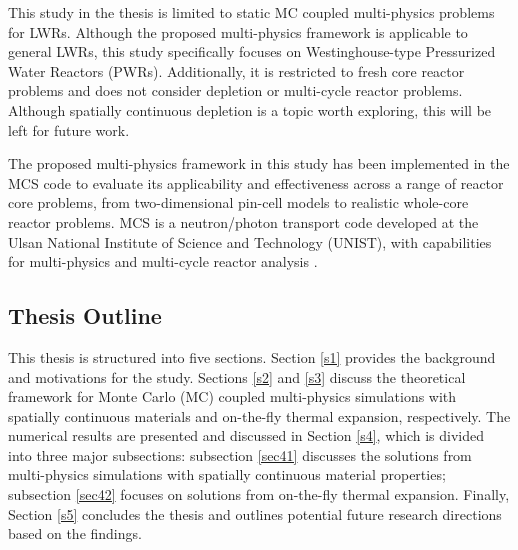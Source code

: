 This study in the thesis is limited to static MC coupled multi-physics problems for LWRs. Although the proposed multi-physics framework is applicable to general LWRs, this study specifically focuses on Westinghouse-type Pressurized Water Reactors (PWRs). Additionally, it is restricted to fresh core reactor problems and does not consider depletion or multi-cycle reactor problems. Although spatially continuous depletion is a topic worth exploring, this will be left for future work.

The proposed multi-physics framework in this study has been implemented in the MCS code \cite{hlee_2020} to evaluate its applicability and effectiveness across a range of reactor core problems, from two-dimensional pin-cell models to realistic whole-core reactor problems. MCS is a neutron/photon transport code developed at the Ulsan National Institute of Science and Technology (UNIST), with capabilities for multi-physics and multi-cycle reactor analysis \cite{hlee_2017, yu_2019, yu_2020}.

\subsection{Thesis Outline}


This thesis is structured into five sections. Section \ref{s1} provides the background and motivations for the study. Sections \ref{s2} and \ref{s3} discuss the theoretical framework for Monte Carlo (MC) coupled multi-physics simulations with spatially continuous materials and on-the-fly thermal expansion, respectively. The numerical results are presented and discussed in Section \ref{s4}, which is divided into three major subsections: subsection \ref{sec41} discusses the solutions from multi-physics simulations with spatially continuous material properties; subsection \ref{sec42} focuses on solutions from on-the-fly thermal expansion. Finally, Section \ref{s5} concludes the thesis and outlines potential future research directions based on the findings.